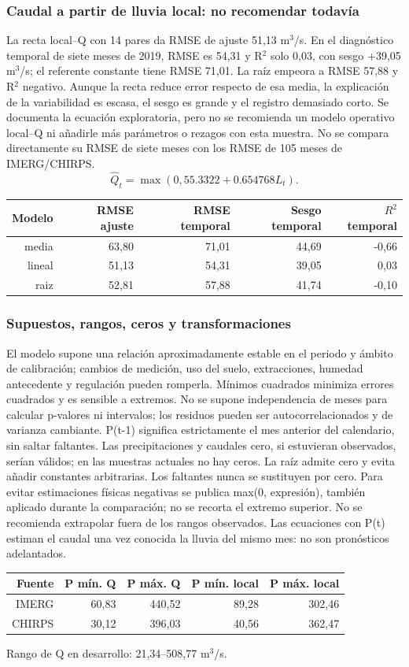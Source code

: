 \documentclass[10pt,a4paper]{article}
\begin{document}
\subsubsection*{Caudal a partir de lluvia local: no recomendar todavía}
La recta local--Q con 14 pares da RMSE de ajuste 51,13 m$^3$/s. En el diagnóstico temporal de siete meses de 2019, RMSE es 54,31 y R$^2$ solo 0,03, con sesgo +39,05 m$^3$/s; el referente constante tiene RMSE 71,01. La raíz empeora a RMSE 57,88 y R$^2$ negativo. Aunque la recta reduce error respecto de esa media, la explicación de la variabilidad es escasa, el sesgo es grande y el registro demasiado corto. Se documenta la ecuación exploratoria, pero no se recomienda un modelo operativo local--Q ni añadirle más parámetros o rezagos con esta muestra. No se compara directamente su RMSE de siete meses con los RMSE de 105 meses de IMERG/CHIRPS.
\[\widehat{Q}_t=\max\left(0,55.3322+0.654768L_t\right).\]
\begin{center}\small\begin{tabular}{rrrrr}\hline
Modelo & RMSE ajuste & RMSE temporal & Sesgo temporal & $R^2$ temporal \\ \hline
media & 63,80 & 71,01 & 44,69 & -0,66 \\
lineal & 51,13 & 54,31 & 39,05 & 0,03 \\
raiz & 52,81 & 57,88 & 41,74 & -0,10 \\
\hline\end{tabular}\end{center}
\subsubsection*{Supuestos, rangos, ceros y transformaciones}
El modelo supone una relación aproximadamente estable en el periodo y ámbito de calibración; cambios de medición, uso del suelo, extracciones, humedad antecedente y regulación pueden romperla. Mínimos cuadrados minimiza errores cuadrados y es sensible a extremos. No se supone independencia de meses para calcular p-valores ni intervalos; los residuos pueden ser autocorrelacionados y de varianza cambiante. P(t-1) significa estrictamente el mes anterior del calendario, sin saltar faltantes. Las precipitaciones y caudales cero, si estuvieran observados, serían válidos; en las muestras actuales no hay ceros. La raíz admite cero y evita añadir constantes arbitrarias. Los faltantes nunca se sustituyen por cero. Para evitar estimaciones físicas negativas se publica max(0, expresión), también aplicado durante la comparación; no se recorta el extremo superior. No se recomienda extrapolar fuera de los rangos observados. Las ecuaciones con P(t) estiman el caudal una vez conocida la lluvia del mismo mes: no son pronósticos adelantados.
\begin{center}\small\begin{tabular}{rrrrr}\hline
Fuente & P mín. Q & P máx. Q & P mín. local & P máx. local \\ \hline
IMERG & 60,83 & 440,52 & 89,28 & 302,46 \\
CHIRPS & 30,12 & 396,03 & 40,56 & 362,47 \\
\hline\end{tabular}\end{center}
Rango de Q en desarrollo: 21,34--508,77 m$^3$/s.
\end{document}
